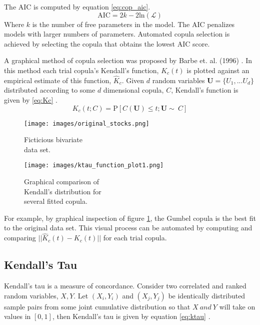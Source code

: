The AIC is computed by equation \ref{eq:cop_aic}.
\begin{equation}
\mathrm{AIC} = 2k - 2\mathrm{ln}(\mathcal{L})
\label{eq:cop_aic}
\end{equation}
Where $k$ is the number of free parameters in the model.  The AIC penalizes models with larger numbers of parameters. 
Automated copula selection is achieved by selecting the copula that obtains the lowest AIC score.

A graphical method of copula selection was proposed by Barbe et. al. (1996) \cite{Barbe1996}.  In this method each trial copula's Kendall's function, $K_c(t)$ is plotted against an empirical estimate of this function, $\hat K_c$.  Given $d$ random variables $\mathbf U=\{U_1, ... U_d\}$ distributed according to some $d$ dimensional copula, $C$, Kendall's function is given by \ref{eq:Kc} \cite{Joe2015}.
\begin{equation}
K_c(t; C) = \mathrm P \left[C(\mathbf U) \leq t; \mathbf{U} \sim\ C\right]
\label{eq:Kc}
\end{equation}

\begin{figure}[!htbp]
	\centering
	\begin{minipage}{.45\textwidth}
		\texttt{[image: images/original\_stocks.png]}
		\caption{Ficticious bivariate \\ data set.}
		\label{fig:biv_data_ex}
	\end{minipage}%
	\begin{minipage}{.45\textwidth}
		\texttt{[image: images/ktau\_function\_plot1.png]}
		\caption{Graphical comparison of  \\ Kendall's distribution for \\ several fitted copula.}
		\label{fig:kc_fn_compare}
	\end{minipage}
\end{figure}
For example, by graphical inspection of figure \ref{fig:kc_fn_compare}, the Gumbel copula is the best fit to the original data set.  This visual process can be automated by computing and comparing $||\hat K_c(t) - K_c(t)||$ for each trial copula.

\subsection*{Kendall's Tau}

Kendall's tau is a measure of concordance.  Consider two correlated and ranked random variables, $X, Y$.
Let $(X_i, Y_i)$ and $(X_j, Y_j)$ be identically distributed sample pairs from some joint cumulative distribution so that $X\ and\ Y$ will take on values in $[0,1]$, then Kendall's tau is given by equation \ref{eq:ktau} \cite{Nelsen2006}.  

